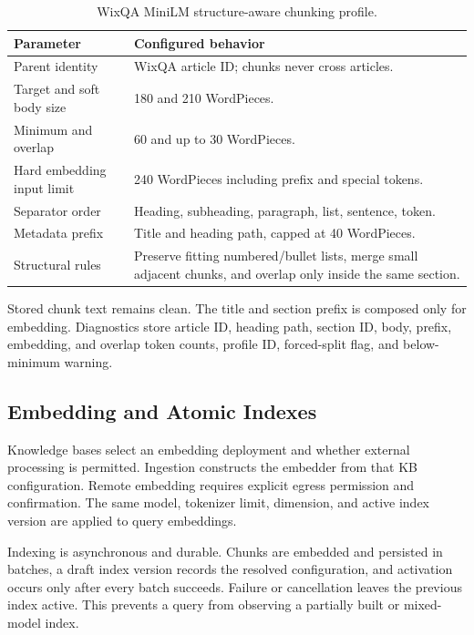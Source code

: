 \begin{table}[H]
  \centering
  \caption{WixQA MiniLM structure-aware chunking profile.}
  \label{tab:wixqa-chunk-profile}
  \begin{tabularx}{\textwidth}{p{}X}
    \toprule
    Parameter & Configured behavior\\
    \midrule
    Parent identity & WixQA article ID; chunks never cross articles.\\
    Target and soft body size & 180 and 210 WordPieces.\\
    Minimum and overlap & 60 and up to 30 WordPieces.\\
    Hard embedding input limit & 240 WordPieces including prefix and special tokens.\\
    Separator order & Heading, subheading, paragraph, list, sentence, token.\\
    Metadata prefix & Title and heading path, capped at 40 WordPieces.\\
    Structural rules & Preserve fitting numbered/bullet lists, merge small
    adjacent chunks, and overlap only inside the same section.\\
    \bottomrule
  \end{tabularx}
\end{table}

Stored chunk text remains clean. The title and section prefix is composed only
for embedding. Diagnostics store article ID, heading path, section ID, body,
prefix, embedding, and overlap token counts, profile ID, forced-split flag, and
below-minimum warning.

\subsection{Embedding and Atomic Indexes}

Knowledge bases select an embedding deployment and whether external processing
is permitted. Ingestion constructs the embedder from that KB configuration.
Remote embedding requires explicit egress permission and confirmation. The
same model, tokenizer limit, dimension, and active index version are applied to
query embeddings.

Indexing is asynchronous and durable. Chunks are embedded and persisted in
batches, a draft index version records the resolved configuration, and
activation occurs only after every batch succeeds. Failure or cancellation
leaves the previous index active. This prevents a query from observing a
partially built or mixed-model index.

